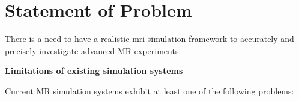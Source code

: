 

\section{Statement of Problem}\label{chapterlabel1sec1}
There is a need to have a realistic \ac{mri} simulation framework to accurately and precisely investigate advanced MR experiments.

\hfill


\large \textbf{Limitations of existing simulation systems} \normalsize

Current MR simulation systems 
exhibit at least one of the following problems:

